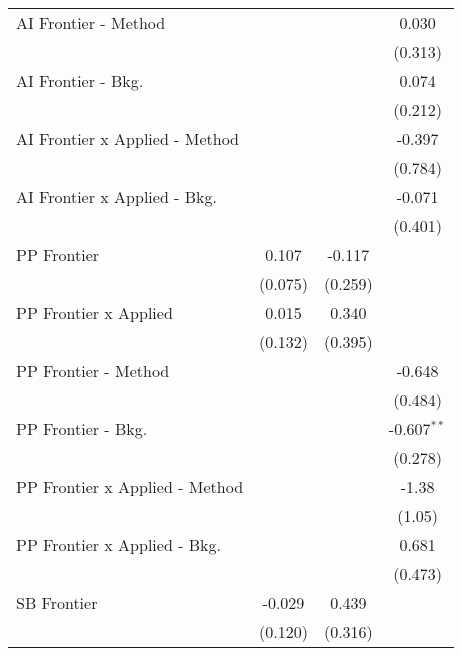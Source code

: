 \begin{tabular}{lccc}
   AI Frontier - Method           &               &               & 0.030\\   
                                  &               &               & (0.313)\\   
   AI Frontier - Bkg.             &               &               & 0.074\\   
                                  &               &               & (0.212)\\   
   AI Frontier x Applied - Method &               &               & -0.397\\   
                                  &               &               & (0.784)\\   
   AI Frontier x Applied - Bkg.   &               &               & -0.071\\   
                                  &               &               & (0.401)\\   
   PP Frontier                    & 0.107         & -0.117        &   \\   
                                  & (0.075)       & (0.259)       &   \\   
   PP Frontier x Applied          & 0.015         & 0.340         &   \\   
                                  & (0.132)       & (0.395)       &   \\   
   PP Frontier - Method           &               &               & -0.648\\   
                                  &               &               & (0.484)\\   
   PP Frontier - Bkg.             &               &               & -0.607$^{**}$\\   
                                  &               &               & (0.278)\\   
   PP Frontier x Applied - Method &               &               & -1.38\\   
                                  &               &               & (1.05)\\   
   PP Frontier x Applied - Bkg.   &               &               & 0.681\\   
                                  &               &               & (0.473)\\   
   SB Frontier                    & -0.029        & 0.439         &   \\   
                                  & (0.120)       & (0.316)       &   \\   

\end{tabular}
